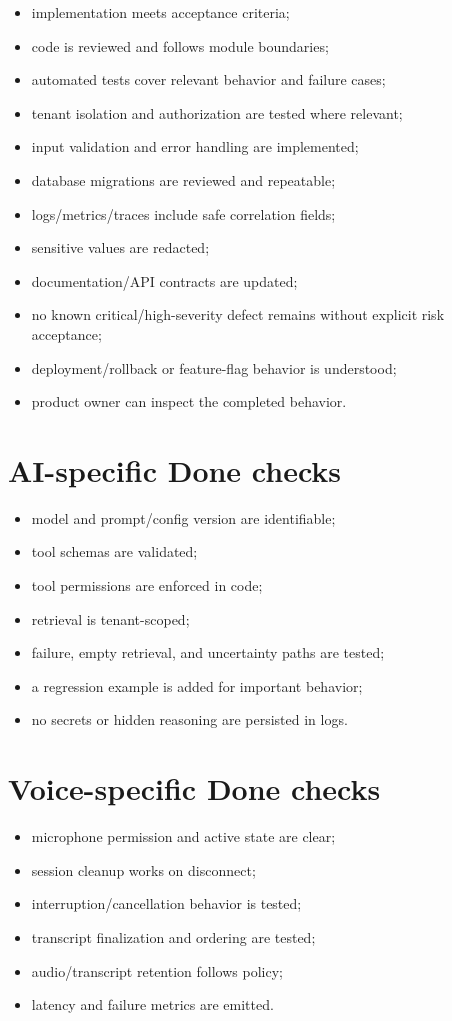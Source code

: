 \begin{itemize}
\item implementation meets acceptance criteria;
\item code is reviewed and follows module boundaries;
\item automated tests cover relevant behavior and failure cases;
\item tenant isolation and authorization are tested where relevant;
\item input validation and error handling are implemented;
\item database migrations are reviewed and repeatable;
\item logs/metrics/traces include safe correlation fields;
\item sensitive values are redacted;
\item documentation/API contracts are updated;
\item no known critical/high-severity defect remains without explicit risk acceptance;
\item deployment/rollback or feature-flag behavior is understood;
\item product owner can inspect the completed behavior.
\end{itemize}
\section{AI-specific Done checks}

\begin{itemize}
\item model and prompt/config version are identifiable;
\item tool schemas are validated;
\item tool permissions are enforced in code;
\item retrieval is tenant-scoped;
\item failure, empty retrieval, and uncertainty paths are tested;
\item a regression example is added for important behavior;
\item no secrets or hidden reasoning are persisted in logs.
\end{itemize}
\section{Voice-specific Done checks}

\begin{itemize}
\item microphone permission and active state are clear;
\item session cleanup works on disconnect;
\item interruption/cancellation behavior is tested;
\item transcript finalization and ordering are tested;
\item audio/transcript retention follows policy;
\item latency and failure metrics are emitted.
\end{itemize}


